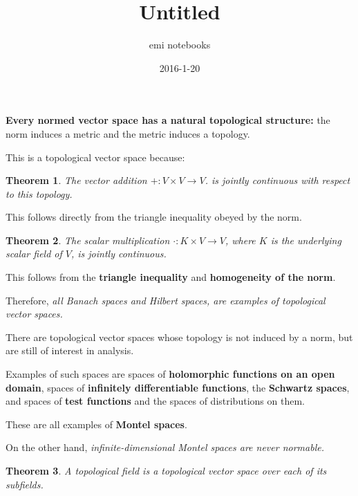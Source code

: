 \documentclass{article}
\title{Untitled}
\author{emi notebooks}
\date{2016-1-20}
\theoremstyle{plain}
\newtheorem{thm}{Theorem}
\begin{document}
\textbf{Every normed vector space has a natural topological structure:} the norm induces a metric and the metric induces a topology. 

This is a topological vector space because:

\begin{thm}
The vector addition $+ : V \times V \rightarrow V$. is jointly continuous with respect to this topology. 
\end{thm}


This follows directly from the triangle inequality obeyed by the norm.


\begin{thm}
The scalar multiplication $\cdot : K \times V \rightarrow V$, where $K$ is the underlying scalar field of $V$, is jointly continuous. 
\end{thm}


This follows from the \textbf{triangle inequality} and \textbf{homogeneity of the norm}.


Therefore, \emph{all Banach spaces and Hilbert spaces, are examples of topological vector spaces.}


There are topological vector spaces whose topology is not induced by a norm, but are still of interest in analysis. 


Examples of such spaces are spaces of \textbf{holomorphic functions on an open domain}, spaces of \textbf{infinitely differentiable functions}, the \textbf{Schwartz spaces}, and spaces of \textbf{test functions} and the spaces of distributions on them. 


These are all examples of \textbf{Montel spaces}. 


On the other hand, \emph{infinite-dimensional Montel spaces are never normable.}

\medskip

\begin{thm} 
A topological field is a topological vector space over each of its subfields.
\end{thm}
\end{document}
